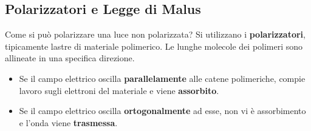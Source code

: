 \documentclass[openany,a4paper,12pt]{book}
\begin{document}
\subsection*{Polarizzatori e Legge di Malus}
Come si può polarizzare una luce non polarizzata? Si utilizzano i \textbf{polarizzatori}, tipicamente lastre di materiale polimerico. Le lunghe molecole dei polimeri sono allineate in una specifica direzione.
\begin{itemize}
    \item Se il campo elettrico oscilla \textbf{parallelamente} alle catene polimeriche, compie lavoro sugli elettroni del materiale e viene \textbf{assorbito}.
    \item Se il campo elettrico oscilla \textbf{ortogonalmente} ad esse, non vi è assorbimento e l'onda viene \textbf{trasmessa}.
\end{itemize}
\end{document}
